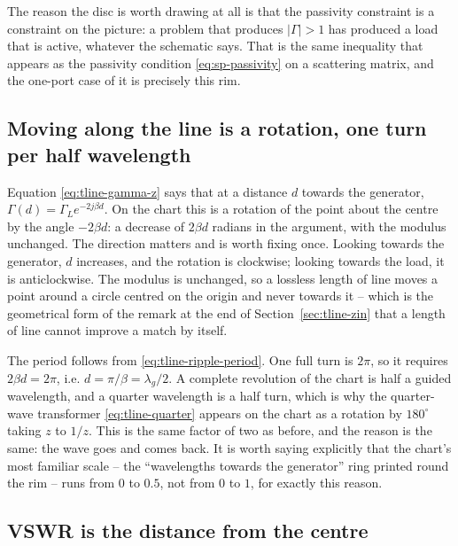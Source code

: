 The reason the disc is worth drawing at all is that the passivity constraint is a constraint on the picture:
a problem that produces $|\Gamma|>1$ has produced a load that is active, whatever the schematic says. That is the
same inequality that appears as the passivity condition \eqref{eq:sp-passivity} on a scattering matrix, and the
one-port case of it is precisely this rim.

\subsection{Moving along the line is a rotation, one turn per half wavelength}
\label{sec:smith-rotation}

Equation \eqref{eq:tline-gamma-z} says that at a distance $d$ towards the generator,
$\Gamma(d)=\Gamma_L e^{-2j\beta d}$. On the chart this is a rotation of the point about the centre by the angle
$-2\beta d$: a decrease of $2\beta d$ radians in the argument, with the modulus unchanged. The direction matters
and is worth fixing once. Looking towards the generator, $d$ increases, and the rotation is clockwise; looking
towards the load, it is anticlockwise. The modulus is unchanged, so a lossless length of line moves a point
around a circle centred on the origin and never towards it -- which is the geometrical form of the remark at the
end of Section~\ref{sec:tline-zin} that a length of line cannot improve a match by itself.

The period follows from \eqref{eq:tline-ripple-period}. One full turn is $2\pi$, so it requires
$2\beta d=2\pi$, i.e. $d=\pi/\beta=\lambda_g/2$. A complete revolution of the chart is half a guided wavelength,
and a quarter wavelength is a half turn, which is why the quarter-wave transformer \eqref{eq:tline-quarter}
appears on the chart as a rotation by $180^\circ$ taking $z$ to $1/z$. This is the same factor of two as before,
and the reason is the same: the wave goes and comes back. It is worth saying explicitly that the chart's most
familiar scale -- the ``wavelengths towards the generator'' ring printed round the rim -- runs from $0$ to
$0.5$, not from $0$ to $1$, for exactly this reason.

\subsection{VSWR is the distance from the centre}
\label{sec:smith-vswr}

